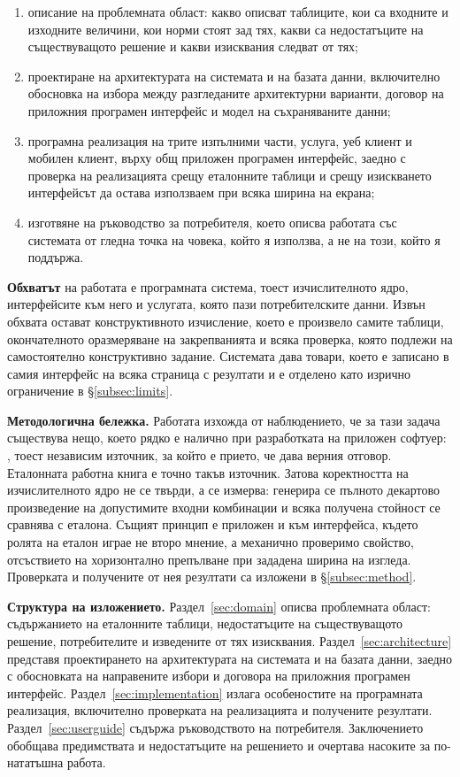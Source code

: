 \begin{enumerate}[topsep=0pt,itemsep=0pt,leftmargin=*]
\item описание на проблемната област: какво описват таблиците, кои са входните и
      изходните величини, кои норми стоят зад тях, какви са недостатъците на
      съществуващото решение и какви изисквания следват от тях;
\item проектиране на архитектурата на системата и на базата данни, включително
      обосновка на избора между разгледаните архитектурни варианти, договор на
      приложния програмен интерфейс и модел на съхраняваните данни;
\item програмна реализация на трите изпълними части, услуга, уеб клиент и мобилен
      клиент, върху общ приложен програмен интерфейс, заедно с проверка на
      реализацията срещу еталонните таблици и срещу изискването интерфейсът да остава
      използваем при всяка ширина на екрана;
\item изготвяне на ръководство за потребителя, което описва работата със системата от
      гледна точка на човека, който я използва, а не на този, който я поддържа.
\end{enumerate}

\textbf{Обхватът} на работата е програмната система, тоест изчислителното ядро,
интерфейсите към него и услугата, която пази потребителските данни. Извън обхвата
остават конструктивното изчисление, което е произвело самите таблици, окончателното
оразмеряване на закрепванията и всяка проверка, която подлежи на самостоятелно
конструктивно задание. Системата дава  товари, което е записано в
самия интерфейс на всяка страница с резултати и е отделено като изрично ограничение
в §\ref{subsec:limits}.

\textbf{Методологична бележка.} Работата изхожда от наблюдението, че за тази задача
съществува нещо, което рядко е налично при разработката на приложен софтуер:
, тоест независим източник, за който е прието, че дава верния отговор.
Еталонната работна книга е точно такъв източник. Затова коректността на
изчислителното ядро не се твърди, а се измерва: генерира се пълното декартово
произведение на допустимите входни комбинации и всяка получена стойност се сравнява
с еталона. Същият принцип е приложен и към интерфейса, където ролята на еталон играе
не второ мнение, а механично проверимо свойство, отсъствието на хоризонтално
препълване при зададена ширина на изгледа. Проверката и получените от нея резултати
са изложени в §\ref{subsec:method}.

\textbf{Структура на изложението.} Раздел~\ref{sec:domain} описва проблемната област:
съдържанието на еталонните таблици, недостатъците на съществуващото решение,
потребителите и изведените от тях изисквания. Раздел~\ref{sec:architecture}
представя проектирането на архитектурата на системата и на базата данни, заедно с
обосновката на направените избори и договора на приложния програмен интерфейс.
Раздел~\ref{sec:implementation} излага особеностите на програмната реализация,
включително проверката на реализацията и получените резултати.
Раздел~\ref{sec:userguide} съдържа ръководството на потребителя. Заключението обобщава
предимствата и недостатъците на решението и очертава насоките за по-нататъшна работа.

